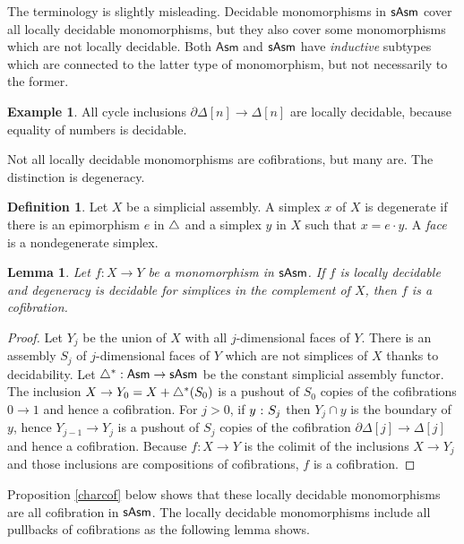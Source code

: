 \documentclass{amsart}
\theoremstyle{plain}
\newtheorem{lemma}[theorem]{Lemma}
\theoremstyle{definition}
\newtheorem{defin}[theorem]{Definition}
\newtheorem{example}[theorem]{Example}
\newcommand\ri{^*}
\newcommand\Asm{\mathsf{Asm}}
\begin{document}
The terminology is slightly misleading. Decidable monomorphisms in $\mathsf{sAsm}$ cover all locally decidable monomorphisms, but they also cover some monomorphisms which are not locally decidable. Both $\Asm$ and $\mathsf{sAsm}$ have \emph{inductive} subtypes which are connected to the latter type of monomorphism, but not necessarily to the former. %

\begin{example} All cycle inclusions $\partial\Delta[n]\to\Delta[n]$ are locally decidable, because equality of numbers is decidable. \end{example}

Not all locally decidable monomorphisms are cofibrations, but many are. The distinction is degeneracy.

\begin{defin} Let $X$ be a simplicial assembly. A simplex $x$ of $X$ is degenerate if there is an epimorphism $e$ in ${\mathord{\triangle}}$ and a simplex $y$ in $X$ such that $x=e\cdot y$. A \emph{face} is a nondegenerate simplex. \end{defin}

\begin{lemma} Let $f:X\to Y$ be a monomorphism in $\mathsf{sAsm}$. If $f$ is locally decidable and degeneracy is decidable for simplices in the complement of $X$, then $f$ is a cofibration. \label{Reedy} \end{lemma}

\begin{proof} Let $Y_j$ be the union of $X$ with all $j$-dimensional faces of $Y$. There is an assembly $S_j$ of $j$-dimensional faces of $Y$ which are not simplices of $X$ thanks to decidability. Let $\simcat\ri:\Asm\to\sAsm$ be the constant simplicial assembly functor. The inclusion $X\to Y_0 = X+\simcat\ri(S_0)$ is a pushout of $S_0$ copies of the cofibrations $0\to 1$ and hence a cofibration. For $j>0$, if $y\mathord{\ :\ } S_j$ then $Y_j\cap y$ is the boundary of $y$, hence $Y_{j-1}\to Y_j$ is a pushout of $S_j$ copies of the cofibration $\partial\Delta[j]\to\Delta[j]$ and hence a cofibration. Because $f:X\to Y$ is the colimit of the inclusions $X\to Y_j$ and those inclusions are compositions of cofibrations, $f$ is a cofibration.
\end{proof}

Proposition \ref{charcof} below shows that these locally decidable monomorphisms are all cofibration in $\mathsf{sAsm}$. The locally decidable monomorphisms include all pullbacks of cofibrations as the following lemma shows.
\end{document}
